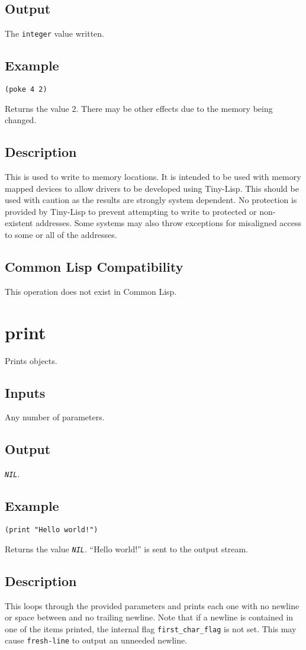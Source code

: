 \documentclass[10pt, openany]{book}
\newcommand{\constant}[1]{\emph{\texttt{#1}}}
\newcommand{\keyword}[1]{\texttt{#1}}
\newcommand{\datatype}[1]{\texttt{#1}}
\newcommand{\tl}{Tiny-Lisp}
\newcommand{\cl}{Common Lisp}
\begin{document}
\subsection{Output}
The \datatype{integer} value written.
\subsection{Example}
\begin{lstlisting}
(poke 4 2)
\end{lstlisting}
Returns the value 2.  There may be other effects due to the memory being changed.
\subsection{Description}
This is used to write to memory locations.  It is intended to be used with memory mapped devices to allow drivers to be developed using \tl{}.  This should be used with caution as the results are strongly system dependent.  No protection is provided by \tl{} to prevent attempting to write to protected or non-existent addresses.  Some systems may also throw exceptions for misaligned access to some or all of the addresses.
\subsection{Common Lisp Compatibility}
This operation does not exist in \cl.

\section{print}
Prints objects.
\subsection{Inputs}
Any number of parameters.
\subsection{Output}
\constant{NIL}.
\subsection{Example}
\begin{lstlisting}
(print "Hello world!")
\end{lstlisting}
Returns the value \constant{NIL}.  ``Hello world!'' is sent to the output stream.
\subsection{Description}
This loops through the provided parameters and prints each one with no newline or space between and no trailing newline.  Note that if a newline is contained in one of the items printed, the internal flag \keyword{first\_char\_flag} is not set.  This may cause \keyword{fresh-line} to output an unneeded newline.
\end{document}
